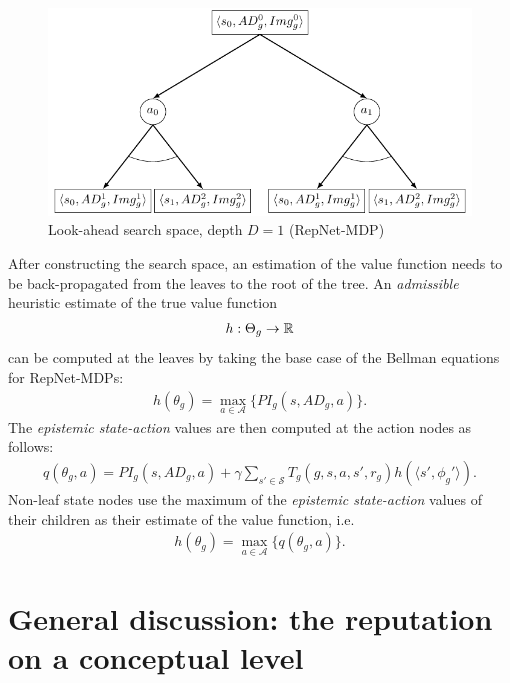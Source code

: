 \begin{figure}[h]
  \begin{center}
    \includegraphics{images/MasterThesisRepNetTreeDraw.pdf}
  \end{center}
  \caption{Look-ahead search space, depth $D=1$ (RepNet-MDP)}\label{fig:repnettree}
\end{figure}

After constructing the search space, an estimation of the value function needs to be back-propagated from the leaves to the root of the tree. An \textit{admissible} heuristic estimate of the true value function
\begin{align}
    h : \Theta_g \rightarrow \mathbb{R}
\end{align}
can be computed at the leaves by taking the base case of the Bellman equations for RepNet-MDPs:
\begin{align}
    h(\theta_g) = \max_{a \in \mathcal{A}} \Big\{ PI_g(s,AD_g,a) \Big\}.
\end{align}
The \textit{epistemic state-action} values are then computed at the action nodes as follows:
\begin{align}
     q(\theta_g, a) = PI_g(s,AD_g,a) + \gamma \sum_{s' \in \mathcal{S}} T_g(g,s,a,s',r_g) h(\big \langle s', \phi_g' \big \rangle).
\end{align}
Non-leaf state nodes use the maximum of the \textit{epistemic state-action} values of their children as their estimate of the value function, i.e.
\begin{align}
    h(\theta_g) = \max_{a \in \mathcal{A}} \Big\{ q(\theta_g, a)  \Big\}.
\end{align}

\section{General discussion: the reputation on a conceptual level}
\label{sec:genn}

